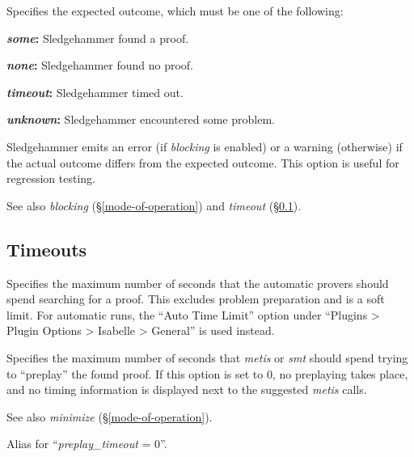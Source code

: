 \documentclass[a4paper,12pt]{article}
\begin{document}
\begin{enum}
Specifies the expected outcome, which must be one of the following:

\begin{enum}
\item[\labelitemi] \textbf{\textit{some}:} Sledgehammer found a proof.
\item[\labelitemi] \textbf{\textit{none}:} Sledgehammer found no proof.
\item[\labelitemi] \textbf{\textit{timeout}:} Sledgehammer timed out.
\item[\labelitemi] \textbf{\textit{unknown}:} Sledgehammer encountered some
problem.
\end{enum}

Sledgehammer emits an error (if \textit{blocking} is enabled) or a warning
(otherwise) if the actual outcome differs from the expected outcome. This option
is useful for regression testing.

\nopagebreak
{\small See also \textit{blocking} (\S\ref{mode-of-operation}) and
\textit{timeout} (\S\ref{timeouts}).}
\end{enum}

\subsection{Timeouts}
\label{timeouts}

\begin{enum}
Specifies the maximum number of seconds that the automatic provers should spend
searching for a proof. This excludes problem preparation and is a soft limit.
For automatic runs, the ``Auto Time Limit'' option under ``Plugins > Plugin
Options > Isabelle > General'' is used instead.

Specifies the maximum number of seconds that \textit{metis} or \textit{smt}
should spend trying to ``preplay'' the found proof. If this option is set to 0,
no preplaying takes place, and no timing information is displayed next to the
suggested \textit{metis} calls.

\nopagebreak
{\small See also \textit{minimize} (\S\ref{mode-of-operation}).}

Alias for ``\textit{preplay\_timeout} = 0''.

\end{enum}

\let\em=\sl
{}

\end{document}
